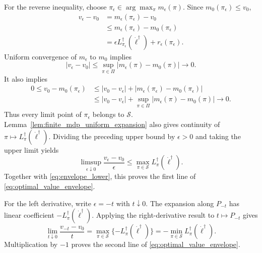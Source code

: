 \documentclass[12pt]{article}
\theoremstyle{remark}\newtheorem{remark}[theorem]{Remark}\theoremstyle{plain}
\begin{document}
For the reverse inequality, choose
$\pi_\epsilon\in\arg\max_\pi m_\epsilon(\pi)$.  Since
$m_0(\pi_\epsilon)\leq v_0$,
\[
    \begin{aligned}
    v_\epsilon-v_0
    &=m_\epsilon(\pi_\epsilon)-v_0\\
    &\leq m_\epsilon(\pi_\epsilon)-m_0(\pi_\epsilon)\\
    &=\epsilon L_{\pi_\epsilon}^\dagger
      (\dot\ell^\dagger)+r_\epsilon(\pi_\epsilon).
    \end{aligned}
\]
Uniform convergence of $m_\epsilon$ to $m_0$ implies
\[
    |v_\epsilon-v_0|
    \leq\sup_{\pi\in\Pi}|m_\epsilon(\pi)-m_0(\pi)|
    \longrightarrow0.
\]
It also implies
\[
    \begin{aligned}
    0\leq v_0-m_0(\pi_\epsilon)
    &\leq |v_0-v_\epsilon|
      +|m_\epsilon(\pi_\epsilon)-m_0(\pi_\epsilon)|\\
    &\leq |v_0-v_\epsilon|
      +\sup_{\pi\in\Pi}|m_\epsilon(\pi)-m_0(\pi)|
      \longrightarrow0.
    \end{aligned}
\]
Thus every limit point of $\pi_\epsilon$ belongs to $\mathcal S$.
Lemma~\ref{lem:finite_mdp_uniform_expansion} also gives continuity of
$\pi\mapsto L_\pi^\dagger(\dot\ell^\dagger)$.  Dividing the preceding
upper bound by $\epsilon>0$ and taking the upper limit yields
\[
    \limsup_{\epsilon\downarrow0}
    \frac{v_\epsilon-v_0}{\epsilon}
    \leq
    \max_{\pi\in\mathcal S}
    L_\pi^\dagger(\dot\ell^\dagger).
\]
Together with \eqref{eq:envelope_lower}, this proves the first line of
\eqref{eq:optimal_value_envelope}.

For the left derivative, write $\epsilon=-t$ with $t\downarrow0$.
The expansion along $P_{-t}$ has linear coefficient
$-L_\pi^\dagger(\dot\ell^\dagger)$.  Applying the right-derivative
result to $t\mapsto P_{-t}$ gives
\[
    \lim_{t\downarrow0}\frac{v_{-t}-v_0}{t}
    =\max_{\pi\in\mathcal S}
    \{-L_\pi^\dagger(\dot\ell^\dagger)\}
    =-\min_{\pi\in\mathcal S}
    L_\pi^\dagger(\dot\ell^\dagger).
\]
Multiplication by $-1$ proves the second line of
\eqref{eq:optimal_value_envelope}.
\end{document}
